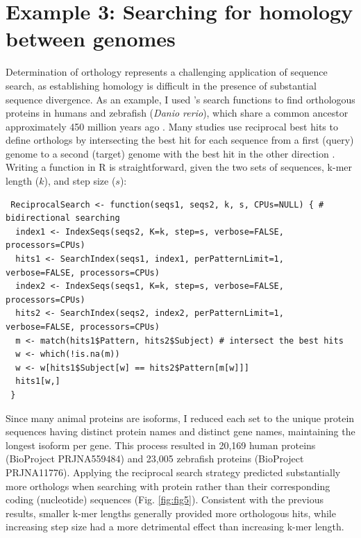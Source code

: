 \section{Example 3: Searching for homology between genomes}\label{example-3-searching-for-homology-between-genomes}

Determination of orthology represents a challenging application of sequence search, as establishing homology is difficult in the presence of substantial sequence divergence. As an example, I used 's search functions to find orthologous proteins in humans and zebrafish (\textit{Danio rerio}), which share a common ancestor approximately 450 million years ago \citep{RN4252}. Many studies use reciprocal best hits to define orthologs by intersecting the best hit for each sequence from a first (query) genome to a second (target) genome with the best hit in the other direction \citep{RN4232}. Writing a  function in R is straightforward, given the two sets of sequences, k-mer length (\(k\)), and step size (\(s\)):

\begin{verbatim}
 ReciprocalSearch <- function(seqs1, seqs2, k, s, CPUs=NULL) { # bidirectional searching
  index1 <- IndexSeqs(seqs2, K=k, step=s, verbose=FALSE, processors=CPUs)
  hits1 <- SearchIndex(seqs1, index1, perPatternLimit=1, verbose=FALSE, processors=CPUs)
  index2 <- IndexSeqs(seqs1, K=k, step=s, verbose=FALSE, processors=CPUs)
  hits2 <- SearchIndex(seqs2, index2, perPatternLimit=1, verbose=FALSE, processors=CPUs)
  m <- match(hits1$Pattern, hits2$Subject) # intersect the best hits
  w <- which(!is.na(m))
  w <- w[hits1$Subject[w] == hits2$Pattern[m[w]]]
  hits1[w,]
 }
\end{verbatim}

Since many animal proteins are isoforms, I reduced each set to the unique protein sequences having distinct protein names and distinct gene names, maintaining the longest isoform per gene. This process resulted in 20,169 human proteins (BioProject PRJNA559484) and 23,005 zebrafish proteins (BioProject PRJNA11776). Applying the reciprocal search strategy predicted substantially more orthologs when searching with protein rather than their corresponding coding (nucleotide) sequences (Fig. \ref{fig:fig5}). Consistent with the previous results, smaller k-mer lengths generally provided more orthologous hits, while increasing step size had a more detrimental effect than increasing k-mer length.

